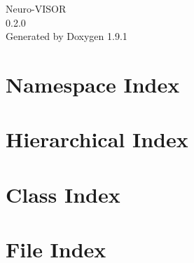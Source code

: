 \let\mypdfximage\pdfximage\def\pdfximage{\immediate\mypdfximage}\documentclass[twoside]{book}
\newcommand{\+}{\discretionary{\mbox{\scriptsize$\hookleftarrow$}}{}{}}
\newcommand{\clearemptydoublepage}{%
  \newpage{\pagestyle{empty}\cleardoublepage}%
}
\begin{document}
\raggedbottom

\hypersetup{pageanchor=false,
             bookmarksnumbered=true,
             pdfencoding=unicode
            }
\begin{titlepage}
\vspace*{7cm}
\begin{center}%
{\Large Neuro-\/\+VISOR \\[1ex]\large 0.\+2.\+0 }\\
\vspace*{1cm}
{\large Generated by Doxygen 1.9.1}\\
\end{center}
\end{titlepage}
\clearemptydoublepage
{}
\tableofcontents
\clearemptydoublepage
{}
\hypersetup{pageanchor=true}

\chapter{Namespace Index}

\chapter{Hierarchical Index}

\chapter{Class Index}

\chapter{File Index}

\end{document}
